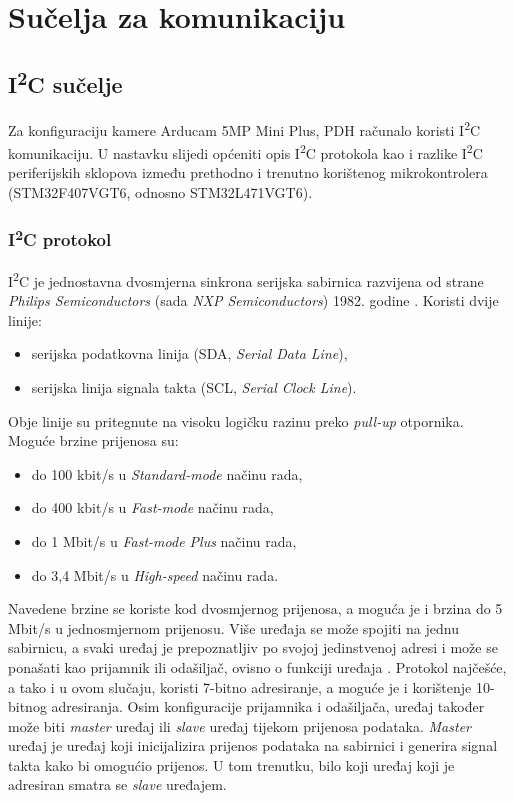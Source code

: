 \chapter{Sučelja za komunikaciju}

\section{I\textsuperscript{2}C sučelje}

Za konfiguraciju kamere Arducam 5MP Mini Plus, PDH računalo koristi I\textsuperscript{2}C komunikaciju. U nastavku slijedi općeniti opis I\textsuperscript{2}C protokola kao i razlike I\textsuperscript{2}C periferijskih sklopova između prethodno i trenutno korištenog mikrokontrolera (STM32F407VGT6, odnosno STM32L471VGT6).

\subsection{I\textsuperscript{2}C protokol}

I\textsuperscript{2}C je jednostavna dvosmjerna sinkrona serijska sabirnica razvijena od strane \textit{Philips Semiconductors} (sada \textit{NXP Semiconductors}) 1982. godine \cite{i2c_wikipedia}. Koristi dvije linije:
\begin{itemize}
	\item serijska podatkovna linija (SDA, \textit{Serial Data Line}),
	\item serijska linija signala takta (SCL, \textit{Serial Clock Line}).
\end{itemize}
Obje linije su pritegnute na visoku logičku razinu preko \textit{pull-up} otpornika. Moguće brzine prijenosa su:
\begin{itemize}
	\item do 100 kbit/s u \textit{Standard-mode} načinu rada, 
	\item do 400 kbit/s u \textit{Fast-mode} načinu rada,
	\item do 1 Mbit/s u \textit{Fast-mode Plus} načinu rada,
	\item do 3,4 Mbit/s u \textit{High-speed} načinu rada.
\end{itemize}
Navedene brzine se koriste kod dvosmjernog prijenosa, a moguća je i brzina do 5 Mbit/s u jednosmjernom prijenosu. Više uređaja se može spojiti na jednu sabirnicu, a svaki uređaj je prepoznatljiv po svojoj jedinstvenoj adresi i može se ponašati kao prijamnik ili odašiljač, ovisno o funkciji uređaja \cite{i2c_manual}. Protokol najčešće, a tako i u ovom slučaju, koristi 7-bitno adresiranje, a moguće je i korištenje 10-bitnog adresiranja. Osim konfiguracije prijamnika i odašiljača, uređaj također može biti \textit{master} uređaj ili \textit{slave} uređaj tijekom prijenosa podataka. \textit{Master} uređaj je uređaj koji inicijalizira prijenos podataka na sabirnici i generira signal takta kako bi omogućio prijenos. U tom trenutku, bilo koji uređaj koji je adresiran smatra se \textit{slave} uređajem.


